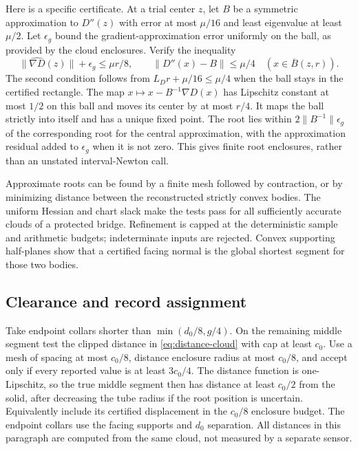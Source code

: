 Here is a specific certificate. At a trial center $z$, let $B$ be a
symmetric approximation to $D''(z)$ with error at most $\mu/16$ and
least eigenvalue at least $\mu/2$. Let $\epsilon_g$ bound the gradient-approximation error uniformly
on the ball, as provided by the cloud enclosures. Verify
the inequality
\begin{equation}\label{eq:newton-test}
 \|\widehat{\nabla D}(z)\|+\epsilon_g\le\mu r/8,
 \qquad \|D''(x)-B\|\le\mu/4\quad(x\in\overline B(z,r)).
\end{equation}
The second condition follows from $L_Dr+\mu/16\le\mu/4$ when the
ball stays in the certified rectangle. The map
$x\mapsto x-B^{-1}\nabla D(x)$ has Lipschitz constant at most $1/2$
on this ball and moves its center by at most $r/4$. It maps the ball
strictly into itself and has a unique fixed point. The root lies within
$2\|B^{-1}\|\epsilon_g$ of the corresponding root for the central
approximation, with the approximation residual added to $\epsilon_g$
when it is not zero. This gives finite root enclosures, rather than an
unstated interval-Newton call.

Approximate roots can be found by a finite mesh followed by contraction,
or by minimizing distance between the reconstructed strictly convex
bodies. The uniform Hessian and chart slack make the tests pass for all
sufficiently accurate clouds of a protected bridge. Refinement is capped
at the deterministic sample and arithmetic budgets; indeterminate inputs
are rejected. Convex supporting half-planes show that a certified facing
normal is the global shortest segment for those two bodies.

\subsection{Clearance and record assignment}
Take endpoint collars shorter than $\min(d_0/8,g/4)$. On the remaining
middle segment test the clipped distance in \eqref{eq:distance-cloud}
with cap at least $c_0$. Use a mesh of spacing at most $c_0/8$, distance
enclosure radius at most $c_0/8$, and accept only if every reported value
is at least $3c_0/4$. The distance function is one-Lipschitz, so the
true middle segment then has distance at least $c_0/2$ from the solid,
after decreasing the tube radius if the root position is uncertain.
Equivalently include its certified displacement in the $c_0/8$ enclosure
budget. The endpoint collars use the facing supports and $d_0$ separation.
All distances in this paragraph are computed from the same cloud, not
measured by a separate sensor.

